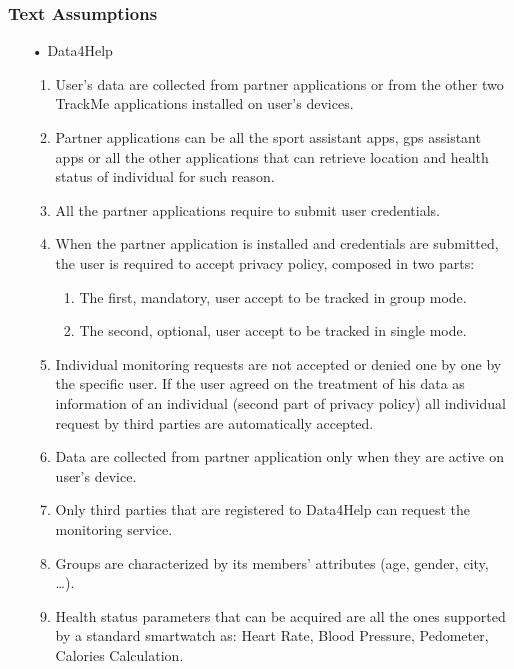 \subsubsection{Text Assumptions}
\begin{enumerate}

\item[•] {\Large Data4Help}
	\begin{enumerate}
	\item User's data are collected from partner applications or from the other two TrackMe applications installed on user's devices.
	\item Partner applications can be all the sport assistant apps, gps assistant apps or all the other applications that can retrieve location and health status of individual for such reason.
	\item All the partner applications require to submit user credentials. 
	\item When the partner application is installed and credentials are submitted,
	the user is required to accept privacy policy, composed in two parts:
		\begin{enumerate}
		\item The first, mandatory, user accept to be tracked in group mode.
		\item The second, optional, user accept to be tracked in single mode.
		\end{enumerate}
	\item Individual monitoring requests are not accepted or denied one by one by the specific user. If the user agreed on the treatment of his data as information of an individual (second part of privacy policy) all individual request by third parties are automatically accepted.	
	\item Data are collected from partner application only when they are active on user's device.
	\item Only third parties that are registered to Data4Help can request the monitoring service.
	\item Groups are characterized by its members' attributes (age, gender, city, …).
	\item Health status parameters that can be acquired are all the ones supported by a standard smartwatch as: Heart Rate, Blood Pressure, Pedometer, Calories Calculation.
	\end{enumerate}
	

\end{enumerate}
